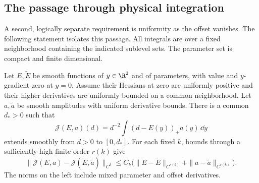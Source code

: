 \subsection{The passage through physical integration}
A second, logically separate requirement is uniformity as the offset
vanishes. The following statement isolates this passage. All integrals
are over a fixed neighborhood containing the indicated sublevel sets.
The parameter set is compact and finite dimensional.

\begin{proposition}
\label{prop:v9-morse-transport}
Let $E,\widetilde E$ be smooth functions of $y\in\R^2$ and of
parameters, with value and $y$-gradient zero at $y=0$. Assume their
Hessians at zero are uniformly positive and their higher derivatives
are uniformly bounded on a common neighborhood. Let $a,\widetilde a$
be smooth amplitudes with uniform derivative bounds. There is a common
$d_*>0$ such that
\[
 \mathcal J(E,a)(d)=d^{-2}\int(d-E(y))_+a(y)\,\dd y
\]
extends smoothly from $d>0$ to $[0,d_*]$. For each fixed $k$, bounds
through a sufficiently high finite order $r(k)$ give
\begin{equation}\label{eq:v9-morse-transport}
 \|\mathcal J(E,a)-\mathcal J(\widetilde E,\widetilde a)\|_{C^k}
 \le C_k\bigl(\|E-\widetilde E\|_{C^{r(k)}}
                    +\|a-\widetilde a\|_{C^{r(k)}}\bigr).
\end{equation}
The norms on the left include mixed parameter and offset derivatives.
\end{proposition}
